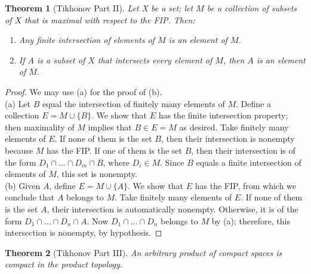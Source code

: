 \documentclass[article,11pt, reqno]{article}
\newtheorem*{theorem}{Theorem}
\theoremstyle{remark}
\newcommand{\<}{\langle}
\renewcommand{\>}{\rangle}
\begin{document}
\begin{theorem}[Tikhonov Part II]
    Let X be a set; let $M$ be a collection of subsets of $X$ that is maximal with respect to the FIP. Then:
    \begin{enumerate}
        \item[(a)] Any finite intersection of elements of $M$ is an element of $M$.
        \item[(b)] If $A$ is a subset of $X$ that intersects every element of $M$, then $A$ is an element of $M$.
    \end{enumerate}
\end{theorem}
\begin{proof} We may use (a) for the proof of (b).\\
    (a) Let $B$ equal the intersection of finitely many elements of $M$. Define a collection $E=M \cup \{B\}$. We show that $E$ has the finite intersection property; then maximality of $M$ implies that $B\in E = M$ as desired.
    Take finitely many elements of $E$. If none of them is the set $B$, then their intersection is nonempty because $M$ has the FIP. If one of them is the set $B$, then their intersection is of the form $D_1\cap\dots\cap D_m\cap B$, where $D_i\in M$. Since $B$ equals a finite intersection of elements of $M$, this set is nonempty.\\
    (b) Given $A$, define $E = M\cup \{ A\}$. We show that $E$ has the FIP, from which we conclude that $A$ belongs to $M$. Take finitely many elements of $E$. If none of them is the set $A$, their intersection is automatically nonempty. Otherwise, it is of the form $D_1\cap\dots\cap D_n\cap A$. Now $D_1\cap\dots\cap D_n$ belongs to $M$ by (a); therefore, this intersection is nonempty, by hypothesis.
\end{proof}
\begin{theorem}[Tikhonov Part III]
    An arbitrary product of compact spaces is compact in the product topology.
\end{theorem}
\end{document}

